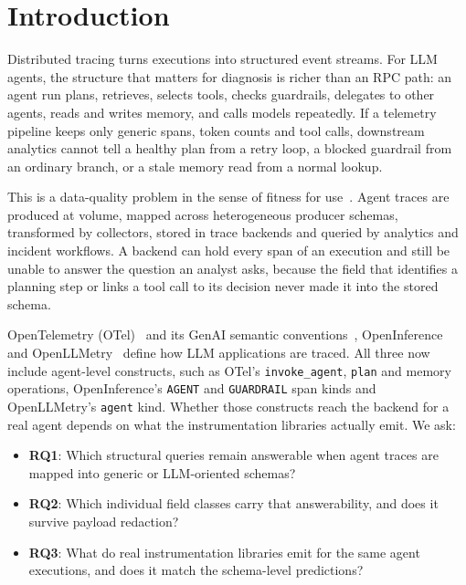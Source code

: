 \documentclass[conference]{IEEEtran}
\begin{document}
\section{Introduction}
\label{sec:introduction}

Distributed tracing turns executions into structured event streams. For
LLM agents, the structure that matters for diagnosis is richer than an
RPC path: an agent run plans, retrieves, selects tools, checks
guardrails, delegates to other agents, reads and writes memory, and
calls models repeatedly. If a telemetry pipeline keeps only generic
spans, token counts and tool calls, downstream analytics cannot tell a
healthy plan from a retry loop, a blocked guardrail from an ordinary
branch, or a stale memory read from a normal lookup.

This is a data-quality problem in the sense of fitness for
use~\cite{wang_strong,batini}. Agent traces are produced at volume,
mapped across heterogeneous producer schemas, transformed by collectors,
stored in trace backends and queried by analytics and incident
workflows. A backend can hold every span of an execution and still be
unable to answer the question an analyst asks, because the field that
identifies a planning step or links a tool call to its decision never
made it into the stored schema.

OpenTelemetry (OTel)~\cite{otel_spec} and its GenAI semantic
conventions~\cite{otel_genai,otel_agent_spans}, OpenInference~\cite{openinference}
and OpenLLMetry~\cite{openllmetry} define how LLM applications are
traced. All three now include agent-level constructs, such as OTel's
\texttt{invoke\_agent}, \texttt{plan} and memory operations,
OpenInference's \texttt{AGENT} and \texttt{GUARDRAIL} span kinds and
OpenLLMetry's \texttt{agent} kind.
Whether those constructs reach the backend for a real agent depends on
what the instrumentation libraries actually emit. We ask:

\begin{itemize}[nosep,leftmargin=*]
\item \textbf{RQ1}: Which structural queries remain answerable when
  agent traces are mapped into generic or LLM-oriented schemas?
\item \textbf{RQ2}: Which individual field classes carry that
  answerability, and does it survive payload redaction?
\item \textbf{RQ3}: What do real instrumentation libraries emit for the
  same agent executions, and does it match the schema-level predictions?
\end{itemize}
\end{document}
